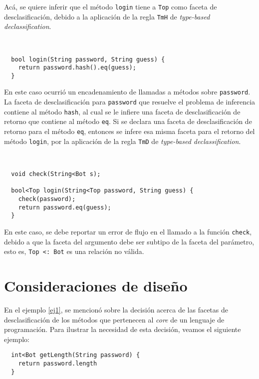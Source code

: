 Acá, se quiere inferir que el método \texttt{login} tiene a \texttt{Top} como faceta de desclasificación, debido a la aplicación de la regla \texttt{TmH} de \textit{type-based declassification}.

\begin{ej} \ \\
  \normalfont
\begin{lstlisting}
  bool login(String password, String guess) {
    return password.hash().eq(guess);
  }
\end{lstlisting}
\end{ej}

En este caso ocurrió un encadenamiento de llamadas a métodos sobre \texttt{password}. La faceta de desclasificación para \texttt{password} que resuelve el problema de inferencia contiene al método \texttt{hash}, al cual se le infiere una faceta de desclasificación de retorno que contiene al método \texttt{eq}. Si se declara una faceta de desclasificación de retorno para el método \texttt{eq}, entonces se infere esa misma faceta para el retorno del método \texttt{login}, por la aplicación de la regla \texttt{TmD} de \textit{type-based declassification}.

\begin{ej} \ \\
  \normalfont
\begin{lstlisting}
  void check(String<Bot s);

  bool<Top login(String<Top password, String guess) {
    check(password);
    return password.eq(guess);
  }
\end{lstlisting}
\end{ej}

En este caso, se debe reportar un error de flujo en el llamado a la función \texttt{check}, debido a que la faceta del argumento debe ser subtipo de la faceta del parámetro, esto es, \texttt{Top <: Bot} es una relación no válida.

\section{Consideraciones de diseño}

En el ejemplo \ref{ej1}, se mencionó sobre la decisión acerca de las facetas de desclasificación de los métodos que pertenecen al \textit{core} de un lenguaje de programación. Para ilustrar la necesidad de esta decisión, veamos el siguiente ejemplo:

\begin{lstlisting}
  int<Bot getLength(String password) {
    return password.length
  }
\end{lstlisting}

